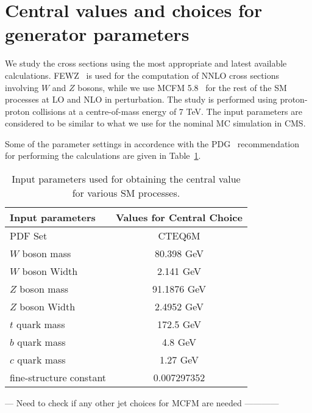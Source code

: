 \section{Central values and choices for generator parameters}
\label{sec:assumptions}

We study the cross sections using the most appropriate and latest available calculations. FEWZ~\cite{fewz} is used 
for the computation of NNLO cross sections involving $W$ and $Z$ bosons, while we use MCFM 5.8~\cite{mcfm} for the rest 
of the SM processes at LO and NLO in perturbation. The study is performed using proton-proton collisions at a 
centre-of-mass energy of 7 TeV. The input parameters are considered to be similar to what we use
for the nominal MC simulation in CMS.

Some of the parameter settings in accordence with the PDG~\cite{pdg} recommendation for performing the calculations 
are given in Table~\ref{tab:input_params}.

\vspace{0.9mm}
\begin{table}[hbt]
\begin{center}
\renewcommand{\arraystretch}{1.2}
\begin{tabular}{|l|c|}\hline
Input parameters & Values for Central Choice \\ \hline
PDF Set & CTEQ6M \\
$W$ boson mass & 80.398 GeV \\ \hline	
$W$ boson Width & 2.141 GeV \\ \hline	
$Z$ boson mass & 91.1876 GeV \\ \hline	
$Z$ boson Width & 2.4952 GeV \\ \hline	
$t$ quark mass & 172.5 GeV \\ \hline	
$b$ quark mass & 4.8 GeV \\ \hline	
$c$ quark mass & 1.27 GeV \\ \hline	
fine-structure constant &  0.007297352 \\ \hline	
\end{tabular} 
\caption{Input parameters used for obtaining the central value for various SM processes.\label{tab:input_params}}
\end{center}
\end{table}

--- Need to check if any other jet choices for MCFM are needed ------------
